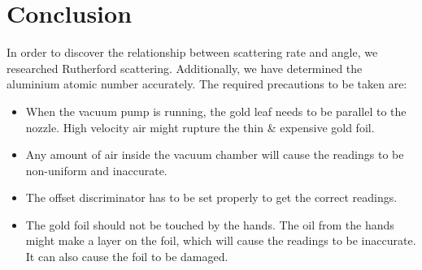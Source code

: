 \section{Conclusion}
	In order to discover the relationship between scattering rate and angle, we researched Rutherford scattering. Additionally, we have determined the aluminium atomic number accurately. The required precautions to be taken are:

	\begin{itemize}
		\item When the vacuum pump is running, the gold leaf needs to be parallel to the nozzle. High velocity air might rupture the thin \& expensive gold foil.
		\item Any amount of air inside the vacuum chamber will cause the readings to be non-uniform and inaccurate.
		\item The offset discriminator has to be set properly to get the correct readings.
		\item The gold foil should not be touched by the hands. The oil from the hands might make a layer on the foil, which will cause the readings to be inaccurate. It can also cause the foil to be damaged.
	\end{itemize}
